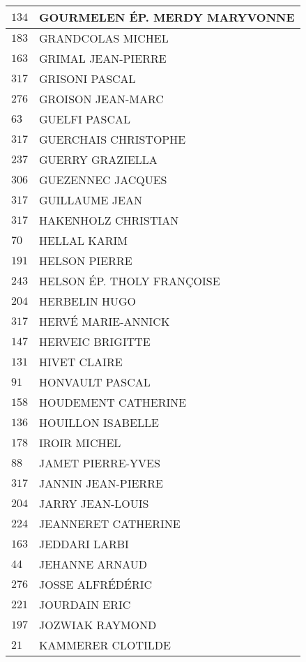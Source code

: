 \begin{xltabular}{\linewidth}{|l|X|}
    \hline
    $134$ & GOURMELEN ÉP. MERDY MARYVONNE \\
    \hline
    $183$ & GRANDCOLAS MICHEL \\
    \hline
    $163$ & GRIMAL JEAN-PIERRE \\
    \hline
    $317$ & GRISONI PASCAL \\
    \hline
    $276$ & GROISON JEAN-MARC \\
    \hline
    $63$ & GUELFI PASCAL \\
    \hline
    $317$ & GUERCHAIS CHRISTOPHE \\
    \hline
    $237$ & GUERRY GRAZIELLA \\
    \hline
    $306$ & GUEZENNEC JACQUES \\
    \hline
    $317$ & GUILLAUME JEAN \\
    \hline
    $317$ & HAKENHOLZ CHRISTIAN \\
    \hline
    $70$ & HELLAL KARIM \\
    \hline
    $191$ & HELSON PIERRE \\
    \hline
    $243$ & HELSON ÉP. THOLY FRANÇOISE \\
    \hline
    $204$ & HERBELIN HUGO \\
    \hline
    $317$ & HERVÉ MARIE-ANNICK \\
    \hline
    $147$ & HERVEIC BRIGITTE \\
    \hline
    $131$ & HIVET CLAIRE \\
    \hline
    $91$ & HONVAULT PASCAL \\
    \hline
    $158$ & HOUDEMENT CATHERINE \\
    \hline
    $136$ & HOUILLON ISABELLE \\
    \hline
    $178$ & IROIR MICHEL \\
    \hline
    $88$ & JAMET PIERRE-YVES \\
    \hline
    $317$ & JANNIN JEAN-PIERRE \\
    \hline
    $204$ & JARRY JEAN-LOUIS \\
    \hline
    $224$ & JEANNERET CATHERINE \\
    \hline
    $163$ & JEDDARI LARBI \\
    \hline
    $44$ & JEHANNE ARNAUD \\
    \hline
    $276$ & JOSSE ALFRÉDÉRIC \\
    \hline
    $221$ & JOURDAIN ERIC \\
    \hline
    $197$ & JOZWIAK RAYMOND \\
    \hline
    $21$ & KAMMERER CLOTILDE \\

\end{xltabular}
